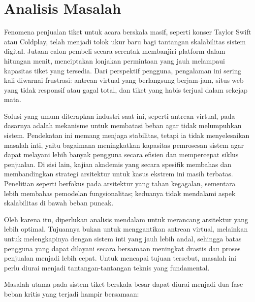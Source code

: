 \section{Analisis Masalah}

Fenomena penjualan tiket untuk acara berskala masif, seperti konser Taylor Swift atau Coldplay, telah menjadi tolok ukur baru bagi tantangan skalabilitas sistem digital. Jutaan calon pembeli secara serentak membanjiri platform dalam hitungan menit, menciptakan lonjakan permintaan yang jauh melampaui kapasitas tiket yang tersedia. Dari perspektif pengguna, pengalaman ini sering kali diwarnai frustrasi: antrean virtual yang berlangsung berjam-jam, situs web yang tidak responsif atau gagal total, dan tiket yang habis terjual dalam sekejap mata.

Solusi yang umum diterapkan industri saat ini, seperti antrean virtual, pada dasarnya adalah mekanisme untuk membatasi beban agar tidak melumpuhkan sistem. Pendekatan ini memang menjaga stabilitas, tetapi ia tidak menyelesaikan masalah inti, yaitu bagaimana meningkatkan kapasitas pemrosesan sistem agar dapat melayani lebih banyak pengguna secara efisien dan mempercepat siklus penjualan. Di sisi lain, kajian akademis yang secara spesifik membahas dan membandingkan strategi arsitektur untuk kasus ekstrem ini masih terbatas. Penelitian seperti \cite{microservicesEventDriven} berfokus pada arsitektur yang tahan kegagalan, sementara \cite{backendForTicketing} lebih membahas pemodelan fungsionalitas; keduanya tidak mendalami aspek skalabilitas di bawah beban puncak.

Oleh karena itu, diperlukan analisis mendalam untuk merancang arsitektur yang lebih optimal. Tujuannya bukan untuk menggantikan antrean virtual, melainkan untuk melengkapinya dengan sistem inti yang jauh lebih andal, sehingga batas pengguna yang dapat dilayani secara bersamaan meningkat drastis dan proses penjualan menjadi lebih cepat. Untuk mencapai tujuan tersebut, masalah ini perlu diurai menjadi tantangan-tantangan teknis yang fundamental.

Masalah utama pada sistem tiket berskala besar dapat diurai menjadi dua fase beban kritis yang terjadi hampir bersamaan:

